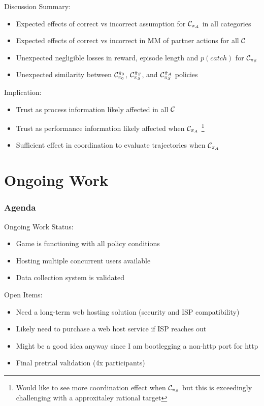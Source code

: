 \documentclass[aspectratio=1610, xcolor=dvipsnames]{packages/beamer}
\newcommand{\displayTOC}{\begin{frame}\frametitle{Agenda} \tableofcontents[currentsection, subsectionstyle=show/show/hide]\end{frame}}
\begin{document}
\newcommand{\rawcond}[2]{\mathcal{C}^{#1}_{#2}}

\begin{frame}{Discussion}
    Summary:
    \begin{itemize}
        \item Expected effects of correct vs incorrect assumption for $\cond[][A]$ in all categories
        \item Expected effects of correct vs incorrect in MM of partner actions for all $\cond[][]$
        \item Unexpected negligible losses in reward, episode length and $p(catch)$ for $\cond[][S]$
        \item Unexpected similarity between $\cond[0][0]$, $\cond[S][S]$, and $\cond[A][S]$ policies
    \end{itemize}
    Implication:
    \begin{itemize}
        \item Trust as process information likely affected in all $\cond[][]$
        \item Trust as performance information likely affected when $\cond[][A]$
            \footnote{Would like to see more coordination effect when  $\cond[][S]$ but this is exceedingly challenging with a approxitaley rational target}
        \item Sufficient effect in coordination to evaluate trajectories when $\cond[][A]$
    \end{itemize}
\end{frame}

\section{Ongoing Work} \displayTOC
\begin{frame}{Ongoing Work}
    Status: \begin{itemize}
        \item Game is functioning with all policy conditions
        \item Hosting multiple concurrent users available
        \item Data collection system is validated
    \end{itemize}

    Open Items: \begin{itemize}
        \item Need a long-term web hosting solution (security and ISP compatibility)
        \item Likely need to purchase a web host service if ISP reaches out
        \item Might be a good idea anyway since I am bootlegging a non-http port for http
        \item Final pretrial validation (4x participants)
    \end{itemize}
\end{frame}
\end{document}
